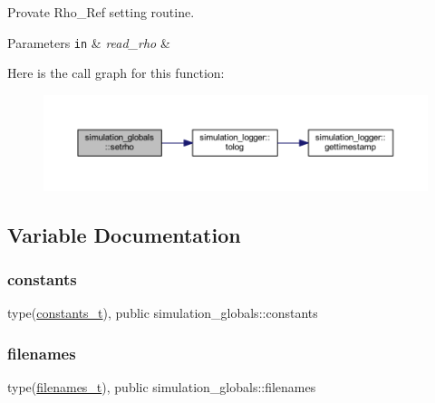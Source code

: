 Provate Rho\+\_\+\+Ref setting routine. 
\begin{DoxyParams}[1]{Parameters}
\mbox{\tt in}  & {\em read\+\_\+rho} & \\
\hline
\end{DoxyParams}
Here is the call graph for this function\+:\nopagebreak
\begin{figure}[H]
\begin{center}
\leavevmode
\includegraphics[width=350pt]{namespacesimulation__globals_acfdc640757f0275bccb1d8de7bd7dc92_cgraph}
\end{center}
\end{figure}


\subsection{Variable Documentation}
\mbox{\label{namespacesimulation__globals_aa3e1a54abbb08d2c09978a3509ec4303}} 
\subsubsection{\texorpdfstring{constants}{constants}}
{\footnotesize\ttfamily type(\hyperlink{structsimulation__globals_1_1constants__t}{constants\+\_\+t}), public simulation\+\_\+globals\+::constants}

\mbox{\label{namespacesimulation__globals_ada5ae97821ffcb77674c3470431101e3}} 
\subsubsection{\texorpdfstring{filenames}{filenames}}
{\footnotesize\ttfamily type(\hyperlink{structsimulation__globals_1_1filenames__t}{filenames\+\_\+t}), public simulation\+\_\+globals\+::filenames}

